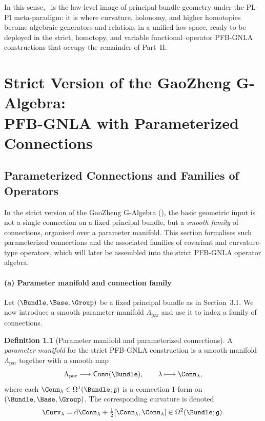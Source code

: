 \documentclass[11pt]{book}
\theoremstyle{plain}
\theoremstyle{definition}
\newtheorem{definition}[theorem]{Definition} \theoremstyle{remark}
\begin{document}
In this sense, \GAlgebra\ is the law-level image of principal-bundle
geometry under the PL-PI meta-paradigm: it is where curvature,
holonomy, and higher homotopies become algebraic generators and
relations in a unified law-space, ready to be deployed in the strict,
homotopy, and variable functional–operator PFB-GNLA constructions that
occupy the remainder of Part~II.



\chapter[Strict Version of the GaoZheng G-Algebra]{Strict Version of the GaoZheng G-Algebra:\\
         PFB-GNLA with Parameterized Connections}


\section{Parameterized Connections and Families of Operators}


In the strict version of the GaoZheng G-Algebra (\GAlgebra), the basic
geometric input is not a single connection on a fixed principal bundle,
but a \emph{smooth family} of connections, organised over a parameter
manifold. This section formalises such parameterized connections and the
associated families of covariant and curvature-type operators, which
will later be assembled into the strict PFB-GNLA operator algebra.



\subsubsection*{(a) Parameter manifold and connection family}

Let $(\Bundle,\Base,\Group)$ be a fixed principal bundle as in
Section~3.1. We now introduce a smooth parameter manifold
$\Lambda_{\mathrm{par}}$ and use it to index a family of connections.

\begin{definition}[Parameter manifold and parameterized connections]
A \emph{parameter manifold} for the strict PFB-GNLA construction is a
  smooth manifold $\Lambda_{\mathrm{par}}$ together with a smooth map
  \[
     \Lambda_{\mathrm{par}}
     \longrightarrow
     \mathsf{Conn}(\Bundle),
     \qquad
     \lambda\longmapsto\Conn_\lambda,
  \]
  where each $\Conn_\lambda\in\Omega^1(\Bundle;\mathfrak{g})$ is a
  connection 1-form on $(\Bundle,\Base,\Group)$. The corresponding
  curvature is denoted
  \[
     \Curv_\lambda
     =
     \mathrm{d}\Conn_\lambda
     + \tfrac12[\Conn_\lambda,\Conn_\lambda]
     \in\Omega^2(\Bundle;\mathfrak{g}).
  \]
\end{definition}
\end{document}
